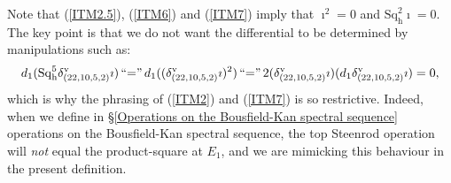 \documentclass[11pt]{amsart} \renewcommand{\baselinestretch}{1.2}
\theoremstyle{plain}
\numberwithin{equation}{section} %
\theoremstyle{plain}
\numberwithin{equation}{chapter} %
\newcommand{\scrC}{\mathscr{C}}
\newcommand{\calx}{\mathcal{X}}
\newcommand{\CommOperad}{{\scrC}}
\newcommand{\minDimP}{\overline{m}}
\newcommand{\excess}{e}
\newcommand{\Sq}{\mathrm{Sq}}
\newcommand{\Eprime}[5]{[E'_{#2}#3]^{#4}_{#5}}
\newcommand{\uver}{^\mathrm{v}}
\newcommand{\dhor}{_\mathrm{h}}
\newcommand{\Sqh}{\mathrm{Sq}\dhor}
\newcommand{\deltav}{\delta\uver}
\begin{document}
\begin{Calculations of HWn}
\begin{list}{(\theequation)}{}
\end{list}
Note that (\ref{ITM2.5}), (\ref{ITM6}) and (\ref{ITM7}) imply that $\imath^2=0$ and $\Sqh^{2}\imath=0$.
The key point is that we do not want the differential to be determined by manipulations such as:
\[d_1(\Sqh^5\deltav_{(22,10,5,2)}\imath)\,\textup{``$=$''}\,d_1((\deltav_{(22,10,5,2)}\imath)^{2})\,\textup{``$=$''}\,
2(\deltav_{(22,10,5,2)}\imath)(d_1\deltav_{(22,10,5,2)}\imath)
=0,\]
which is why the phrasing of (\ref{ITM2}) and (\ref{ITM7}) is so restrictive.
Indeed, when we define in \S\ref{Operations on the Bousfield-Kan spectral sequence} operations on the Bousfield-Kan spectral sequence,  the top Steenrod operation will \emph{not} equal the product-square at $E_1$,  and we are mimicking  this behaviour in the present definition.


\end{Calculations of HWn}
\end{document}
